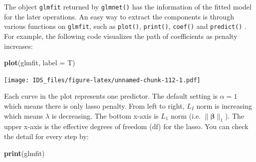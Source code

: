 \documentclass[12pt,]{krantz}
\makeatletter
\newenvironment{Shaded}{\begin{snugshade}}{\end{snugshade}}
\newcommand{\CommentTok}[1]{\textcolor[rgb]{0.37,0.37,0.37}{\textit{#1}}}
\newcommand{\DataTypeTok}[1]{\textcolor[rgb]{0.27,0.27,0.27}{#1}}
\newcommand{\DecValTok}[1]{\textcolor[rgb]{0.06,0.06,0.06}{#1}}
\newcommand{\KeywordTok}[1]{\textcolor[rgb]{0.27,0.27,0.27}{\textbf{#1}}}
\newcommand{\NormalTok}[1]{#1}
\newcommand{\OperatorTok}[1]{\textcolor[rgb]{0.43,0.43,0.43}{\textbf{#1}}}
\newcommand{\StringTok}[1]{\textcolor[rgb]{0.5,0.5,0.5}{#1}}
\newenvironment{kframe}{%
\medskip{}
\setlength{\fboxsep}{.8em}
 \def\at@end@of@kframe{}%
 \ifinner\ifhmode%
  \def\at@end@of@kframe{\end{minipage}}%
  \begin{minipage}{\columnwidth}%
 \fi\fi%
 \def\FrameCommand##1{\hskip\@totalleftmargin \hskip-\fboxsep
 \colorbox{shadecolor}{##1}\hskip-\fboxsep
     \hskip-\linewidth \hskip-\@totalleftmargin \hskip\columnwidth}%
 \MakeFramed {\advance\hsize-\width
   \@totalleftmargin\z@ \linewidth\hsize
   \@setminipage}}%
 {\par\unskip\endMakeFramed%
 \at@end@of@kframe}
\renewenvironment{Shaded}{\begin{kframe}}{\end{kframe}}
\makeatother
\begin{document}
\begin{Shaded}
\end{Shaded}

The object \texttt{glmfit} returned by \texttt{glmnet()} has the information of the fitted model for the later operations. An easy way to extract the components is through various functions on \texttt{glmfit}, such as \texttt{plot()}, \texttt{print()}, \texttt{coef()} and \texttt{predict()} . For example, the following code visualizes the path of coefficients as penalty increases:

\begin{Shaded}
\begin{Highlighting}[]
\KeywordTok{plot}\NormalTok{(glmfit, }\DataTypeTok{label =}\NormalTok{ T)}
\end{Highlighting}
\end{Shaded}

\texttt{[image: IDS\_files/figure-latex/unnamed-chunk-112-1.pdf]}

Each curve in the plot represents one predictor. The default setting is \(\alpha=1\) which means there is only lasso penalty. From left to right, \(L_I\) norm is increasing which means \(\lambda\) is decreasing. The bottom x-axis is \(L_1\) norm (i.e. \(\parallel\symbf{\beta}\parallel_{1}\)). The upper x-axis is the effective degrees of freedom (df) for the lasso. You can check the detail for every step by:

\begin{Shaded}
\begin{Highlighting}[]
\KeywordTok{print}\NormalTok{(glmfit)}
\end{Highlighting}
\end{Shaded}
\end{document}
